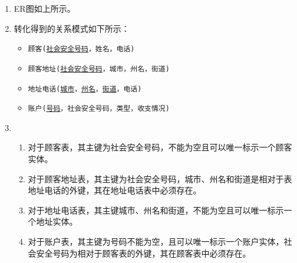\documentclass[10pt,a4paper]{article}
\begin{document}
	\begin{enumerate} 
		\item ER图如上所示。
		\item 转化得到的关系模式如下所示：
		\begin{itemize}
			\item \texttt{顾客(\underline{社会安全号码}，姓名，电话)}
			\item \texttt{顾客地址(\underline{社会安全号码}，城市，州名，街道)}
			\item \texttt{地址电话(\underline{城市}，\underline{州名}，\underline{街道}，电话)}
			\item \texttt{账户(\underline{号码}，社会安全号码，类型，收支情况)}
		\end{itemize}
		\item \begin{enumerate}
			\item 对于顾客表，其主键为社会安全号码，不能为空且可以唯一标示一个顾客实体。
			\item 对于顾客地址表，其主键为社会安全号码，城市、州名和街道是相对于表地址电话的外键，其在地址电话表中必须存在。
			\item 对于地址电话表，其主键城市、州名和街道，不能为空且可以唯一标示一个地址实体。
			\item 对于账户表，其主键为号码不能为空，且可以唯一标示一个账户实体，社会安全号码为相对于顾客表的外键，其在顾客表中必须存在。
		\end{enumerate}
	\end{enumerate}
	\newpage
\end{document}
